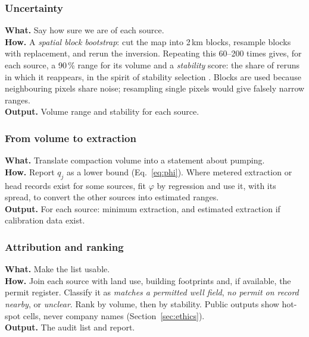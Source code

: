 \subsubsection{ Uncertainty}
\textbf{What.} Say how sure we are of each source.\\
\textbf{How.} A \emph{spatial block bootstrap}: cut the map into 2\,km blocks, resample blocks with
replacement, and rerun the inversion. Repeating this 60--200 times gives, for each source, a 90\,\%
range for its volume and a \emph{stability} score: the share of reruns in which it reappears, in the
spirit of stability selection \cite{meinshausen2010}. Blocks are used because neighbouring pixels
share noise; resampling single pixels would give falsely narrow ranges.\\
\textbf{Output.} Volume range and stability for each source.

\subsubsection{ From volume to extraction}
\textbf{What.} Translate compaction volume into a statement about pumping.\\
\textbf{How.} Report $q_j$ as a lower bound (Eq.~\ref{eq:phi}). Where metered extraction or head
records exist for some sources, fit $\varphi$ by regression and use it, with its spread, to convert
the other sources into estimated ranges.\\
\textbf{Output.} For each source: minimum extraction, and estimated extraction if calibration data
exist.

\subsubsection{ Attribution and ranking}
\textbf{What.} Make the list usable.\\
\textbf{How.} Join each source with land use, building footprints and, if available, the permit
register. Classify it as \emph{matches a permitted well field}, \emph{no permit on record nearby}, or
\emph{unclear}. Rank by volume, then by stability. Public outputs show hot-spot cells, never company
names (Section~\ref{sec:ethics}).\\
\textbf{Output.} The audit list and report.

